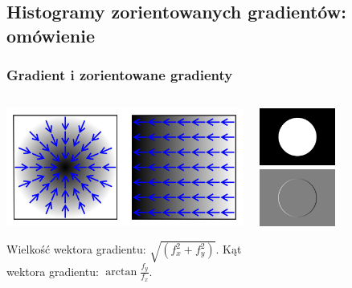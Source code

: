 \documentclass{beamer}
\begin{document}
        \subsection{Histogramy zorientowanych gradientów: omówienie}
            \begin{frame}
                \frametitle{Gradient i zorientowane gradienty}
                \begin{columns}
                    \begin{column}{0.5\textwidth}
                        \begin{center}
                            \includegraphics[width=1\textwidth]{pictures/gradient.png}
                        \end{center}
                            Wielkość wektora gradientu: $\sqrt{\left( f^{2}_{x}+f^{2}_{y}\right)}$.
                            \newline
                            \newline
                            Kąt wektora gradientu: $\arctan{\frac{f_{y}}{f_{x}}}$.
                    \end{column}
                    \begin{column}{0.5\textwidth}
                        \begin{center}
                            \includegraphics[width=0.5\textwidth]{pictures/circle.png}
                            \includegraphics[width=0.5\textwidth]{pictures/gradient_x.png}

\end{center}
\end{column}
\end{columns}
\end{frame}
\end{document}
